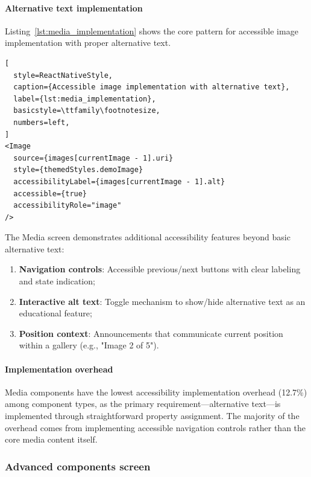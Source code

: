 \paragraph{Alternative text implementation}

Listing~\ref{lst:media_implementation} shows the core pattern for accessible image implementation with proper alternative text.

\begin{lstlisting}[
  style=ReactNativeStyle,
  caption={Accessible image implementation with alternative text},
  label={lst:media_implementation},
  basicstyle=\ttfamily\footnotesize,
  numbers=left,
]
<Image
  source={images[currentImage - 1].uri}
  style={themedStyles.demoImage}
  accessibilityLabel={images[currentImage - 1].alt}
  accessible={true}
  accessibilityRole="image"
/>
\end{lstlisting}

The Media screen demonstrates additional accessibility features beyond basic alternative text:

\begin{enumerate}
    \item \textbf{Navigation controls}: Accessible previous/next buttons with clear labeling and state indication;
    
    \item \textbf{Interactive alt text}: Toggle mechanism to show/hide alternative text as an educational feature;
    
    \item \textbf{Position context}: Announcements that communicate current position within a gallery (e.g., "Image 2 of 5").
\end{enumerate}

\paragraph{Implementation overhead}

Media components have the lowest accessibility implementation overhead (12.7\%) among component types, as the primary requirement—alternative text—is implemented through straightforward property assignment. The majority of the overhead comes from implementing accessible navigation controls rather than the core media content itself.

\subsubsection{Advanced components screen}
\label{subsubsec:advanced-screen}

